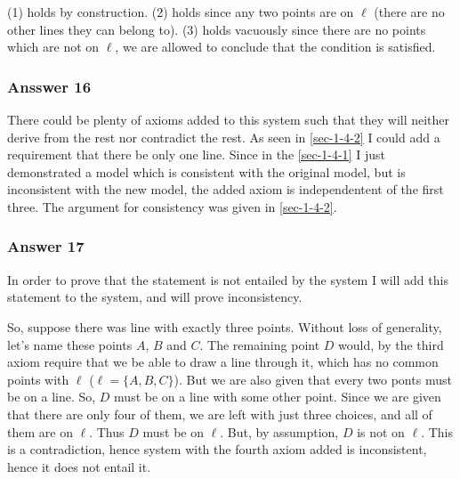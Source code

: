 \documentclass[11pt]{article}
\begin{document}
(1) holds by construction.
(2) holds since any two points are on $\ell$ (there are no other
lines they can belong to).
(3) holds vacuously since there are no points which are not on $\ell$,
we are allowed to conclude that the condition is satisfied.
\subsubsection{Ansswer 16}
\label{sec-1-4-3}
There could be plenty of axioms added to this system such that they
will neither derive from the rest nor contradict the rest.  As
seen in \ref{sec-1-4-2} I could add a requirement that there be only
one line.  Since in the \ref{sec-1-4-1} I just demonstrated a model which
is consistent with the original model, but is inconsistent with
the new model, the added axiom is independentent of the first three.
The argument for consistency was given in \ref{sec-1-4-2}.
\subsubsection{Answer 17}
\label{sec-1-4-4}
In order to prove that the statement is not entailed by the system I
will add this statement to the system, and will prove inconsistency.

So, suppose there was line with exactly three points.  Without loss of
generality, let's name these points $A$, $B$ and $C$.  The remaining
point $D$ would, by the third axiom require that we be able to draw a line
through it, which has no common points with $\ell$ ($\ell=\{A,B,C\}$).
But we are also given that every two ponts must be on a line.  So, $D$
must be on a line with some other point.  Since we are given that there
are only four of them, we are left with just three choices, and all of
them are on $\ell$.  Thus $D$ must be on $\ell$.  But, by assumption,
$D$ is not on $\ell$.  This is a contradiction, hence system with
the fourth axiom added is inconsistent, hence it does not entail it.
\end{document}
